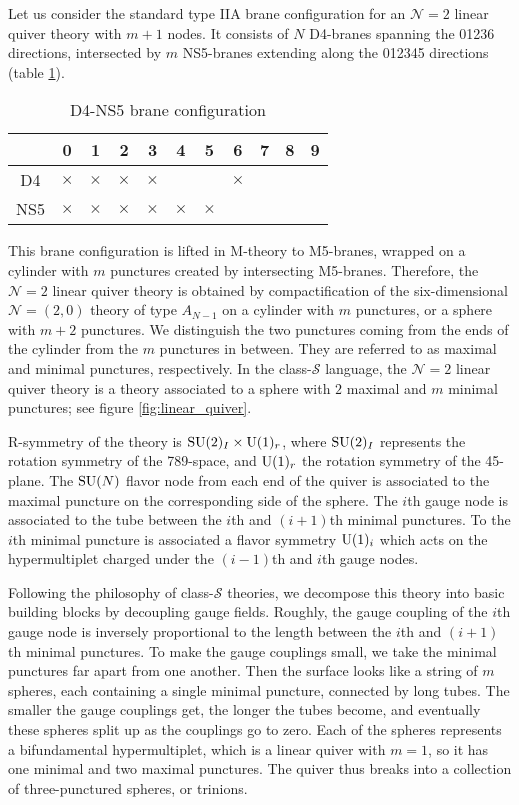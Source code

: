 Let us consider the standard type IIA brane configuration for an $\mathcal{N}=2$
linear quiver theory with $m+1$ nodes. It consists of $N$ D4-branes
spanning the 01236 directions, intersected by $m$ NS5-branes extending
along the 012345 directions (table \ref{tab:D4NS5}).
\begin{table}
\caption{D4-NS5 brane configuration}
\label{tab:D4NS5}
\vspace{0.2cm}
  \centering
    \begin{tabular}{|c|c|c|c|c|c|c|c|c|c|c|}
\hline
  & 0 & 1 & 2 & 3 & 4 & 5 & 6 & 7 & 8 & 9\tabularnewline
\hline
D4       & $\times$ & $\times$ & $\times$ & $\times$ &    &    &    $\times$ & \phantom{X} & \phantom{X} &  \tabularnewline
\hline
NS5    & $\times$ & $\times$ & $\times$ & $\times$ & $\times$ & $\times$ &    &    &    &  \phantom{X}  \tabularnewline
\hline
    \end{tabular}
\end{table}
This brane configuration is lifted in M-theory to M5-branes, wrapped
on a cylinder with $m$ punctures created by intersecting M5-branes.
Therefore, the $\mathcal{N}=2$ linear quiver theory is obtained by
compactification of the six-dimensional $\mathcal{N}=( 2,0 )$ theory
of type $A_{N-1}$ on a cylinder with $m$ punctures, or a sphere
with $m+2$ punctures. We distinguish the two punctures coming from
the ends of the cylinder from the $m$ punctures in between. They
are referred to as maximal and minimal punctures, respectively. In
the class-$\mathcal{S}$ language, the $\mathcal{N}=2$ linear quiver
theory is a theory associated to a sphere with $2$ maximal and $m$
minimal punctures; see figure \ref{fig:linear_quiver}.

R-symmetry of the theory is $\mathrm{SU}(2)_{I} \times \mathrm{U}(1)_{r}$, where $\mathrm{SU}(2)_{I}$
represents the rotation symmetry of the 789-space, and $\mathrm{U}(1)_{r}$
the rotation symmetry of the 45-plane. The $\mathrm{SU}(N)$ flavor node from
each end of the quiver is associated to the maximal puncture on the
corresponding side of the sphere. The $i$th gauge node is associated
to the tube between the $i$th and $(i+1)$th minimal punctures. To
the $i$th minimal puncture is associated a flavor symmetry $\mathrm{U}(1)_{i}$
which acts on the hypermultiplet charged under the $(i-1)$th and
$i$th gauge nodes.

Following the philosophy of class-$\mathcal{S}$ theories, we decompose
this theory into basic building blocks by decoupling gauge fields.
Roughly, the gauge coupling of the $i$th gauge node is inversely
proportional to the length between the $i$th and $(i+1)$th minimal
punctures. To make the gauge couplings small, we take the minimal
punctures far apart from one another. Then the surface looks like
a string of $m$ spheres, each containing a single minimal puncture,
connected by long tubes. The smaller the gauge couplings get, the
longer the tubes become, and eventually these spheres split up as
the couplings go to zero. Each of the spheres represents a bifundamental
hypermultiplet, which is a linear quiver with $m=1$, so it has one
minimal and two maximal punctures. The quiver thus breaks into a collection
of three-punctured spheres, or trinions.


